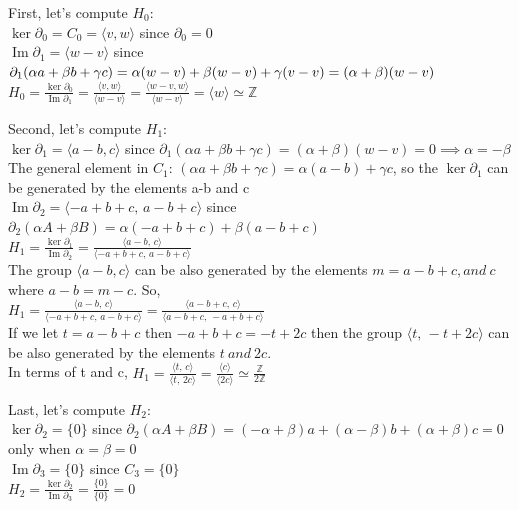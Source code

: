 \documentclass[11pt,a4paper]{report}
\DeclareMathOperator{\Ima}{Im}
\begin{document}
\par
First, let's compute $H_0$: \\
$\ker\partial_0 = C_0 = \langle v,w \rangle$
		since $\partial_0 = 0$ \\
$\Ima\partial_1 = \langle w-v \rangle$
		since $\partial_1(\alpha a + \beta b + \gamma c) = \alpha (w-v) + \beta (w-v) + \gamma (v-v)  \\ =(\alpha + \beta)(w-v) $ \\
$H_0 = \frac{\ker\partial_0}{\Ima\partial_1} = \frac{ \langle v, w \rangle  }{ \langle w-v \rangle } = \frac{ \langle w-v, w \rangle  }{ \langle w-v \rangle }
                                                             =\langle w \rangle  \simeq \mathbb{Z}$ \\

\par
Second, let's compute $H_1$: \\
$\ker\partial_1 = \langle a-b,c \rangle$
		since $\partial_1(\alpha a + \beta b + \gamma c) = (\alpha + \beta)(w-v) = 0  \implies \alpha = -\beta$ \\
The general element in $C_1$: $ (\alpha a + \beta b + \gamma c)= \alpha(a-b) + \gamma c $,
so the $\ker\partial_1$ can be generated by the elements a-b and c \\
$\Ima\partial_2 = \langle -a+b+c,\, a-b+c \rangle $
		since $\partial_2(\alpha A + \beta B) = \alpha(-a+b+c) + \beta(a-b+c)$ \\
$H_1 = \frac{\ker\partial_1}{\Ima\partial_2} =
		\frac{ \langle a-b, \,c \rangle  }{ \langle -a+b+c,\, a-b+c \rangle }$\\
The group $\langle a-b, c \rangle$ can be also generated by the elements
		$ m=a-b+c, and \: c $ where $ a - b = m -c $. So, \\
$H_1 = \frac{ \langle a-b, \,c \rangle  }{ \langle -a+b+c,\, a-b+c \rangle } = \frac{ \langle a-b+c, \, c \rangle  }{ \langle a-b+c,\, -a+b+c \rangle } $ \\
If we let $t=a-b+c$ then $-a+b+c = -t + 2c $ then the group $\langle t,\, -t+2c \rangle$ can be also generated by the elements $ t \: and \: 2c $. \\
In terms of t and c, $H_1 = \frac{ \langle t, \,c \rangle  }{ \langle t,\, 2c \rangle } = \frac{  \langle c \rangle  }{ \langle 2c \rangle } \simeq \frac{\mathbb{Z}}{2\mathbb{Z}}$ \\

\par
Last, let's compute $H_2$: \\
$\ker\partial_2 = \{0\}$
		since $\partial_2(\alpha A + \beta B) = (-\alpha+\beta)a +  (\alpha-\beta)b + (\alpha+\beta)c = 0 $ only when $\alpha = \beta = 0$\\
$\Ima\partial_3 = \{0\}$ since $C_3 = \{0\}$ \\
$H_2 = \frac{\ker\partial_2}{\Ima\partial_3} =
		\frac{\{0\} }{\{0\}} = 0 $ \\
\end{document}
